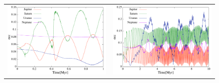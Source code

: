\documentclass[11pt,a4paper,oneside,onecolumn]{jarticle}
\begin{document}
\begin{figure}[H]
\begin{tabular}{cc}
\begin{minipage}[t]{0.45\hsize}
\centering
\includegraphics[width=7.6cm]{./image/move500kyr_ecc_1Myr.pdf}
\end{minipage} &
\begin{minipage}[t]{0.45\hsize}
\centering
\includegraphics[width=7.6cm]{./image/move500kyr_ecc_10Myr.pdf}
\end{minipage}
%
\end{tabular}
\caption{\label{}}
\end{figure}
\end{document}
